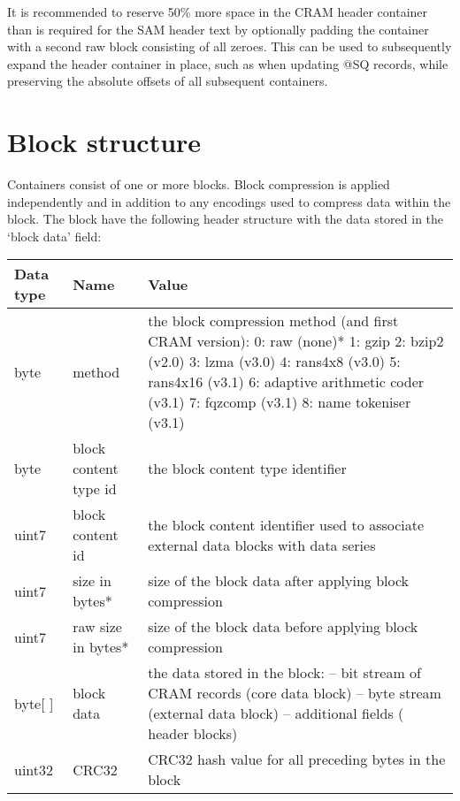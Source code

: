 \documentclass[a4paper]{article}
\begin{document}
It is recommended to reserve 50\% more space in the CRAM header container than
is required for the SAM header text by optionally padding the container with a second
raw block consisting of all zeroes. This can be used to subsequently expand the header
container in place, such as when updating @SQ records, while preserving the absolute
offsets of all subsequent containers.

\section{\textbf{Block structure}}
\label{sec:block-struct}

Containers consist of one or more blocks. Block compression is applied independently 
and in addition to any encodings used to compress data within the block. The block 
have the following header structure with the data stored in the `block data' field:

\begin{tabular}{|l|>{\raggedright}p{120pt}|>{\raggedright}p{260pt}|}
\hline
\textbf{Data type} & \textbf{Name} & \textbf{Value}
\tabularnewline
\hline
byte & method & the block compression method (and first CRAM version): \linebreak{}
0: raw (none)*\linebreak{}
1: gzip\linebreak{}
2: bzip2 (v2.0)\linebreak{}
3: lzma (v3.0)\linebreak{}
4: rans4x8 (v3.0)\linebreak{}
5: rans4x16 (v3.1)\linebreak{}
6: adaptive arithmetic coder (v3.1)\linebreak{}
7: fqzcomp (v3.1)\linebreak{}
8: name tokeniser (v3.1)
\tabularnewline
\hline
byte & block content type id & the block content type identifier\tabularnewline
\hline
uint7 & block content id & the block content identifier used to associate external 
data blocks with data series\tabularnewline
\hline
uint7 & size in bytes* & size of the block data after applying block compression\tabularnewline
\hline
uint7 & raw size in bytes* & size of the block data before applying block compression\tabularnewline
\hline
byte[ ] & block data & the data stored in the block:\linebreak{}
-- bit stream of CRAM records (core data block)\linebreak{}
-- byte stream (external data block)\linebreak{}
-- additional fields ( header blocks)\tabularnewline
\hline
uint32 & CRC32 & CRC32 hash value for all preceding bytes in the block\tabularnewline
\hline
\end{tabular}
\end{document}
